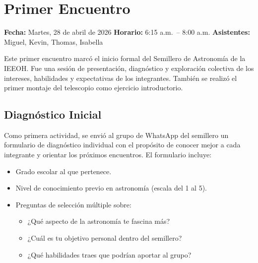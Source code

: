 \chapter{Primer Encuentro}

\begin{destacado}
    \textbf{Fecha:} Martes, 28 de abril de 2026 \quad
    \textbf{Horario:} 6:15 a.m.\ -- 8:00 a.m. \quad
    \textbf{Asistentes:} Miguel, Kevin, Thomas, Isabella
\end{destacado}

\medskip

Este primer encuentro marcó el inicio formal del Semillero de Astronomía de la IEEOH.
Fue una sesión de presentación, diagnóstico y exploración colectiva de los intereses,
habilidades y expectativas de los integrantes. También se realizó el primer montaje del
telescopio como ejercicio introductorio.

\section{Diagnóstico Inicial}

Como primera actividad, se envió al grupo de WhatsApp del semillero un formulario de
diagnóstico individual con el propósito de conocer mejor a cada integrante y orientar
los próximos encuentros. El formulario incluye:

\begin{itemize}[leftmargin=1.5em]
    \item Grado escolar al que pertenece.
    \item Nivel de conocimiento previo en astronomía (escala del 1 al 5).
    \item Preguntas de selección múltiple sobre:
        \begin{itemize}
            \item ¿Qué aspecto de la astronomía te fascina más?
            \item ¿Cuál es tu objetivo personal dentro del semillero?
            \item ¿Qué habilidades traes que podrían aportar al grupo?
        \end{itemize}
\end{itemize}

